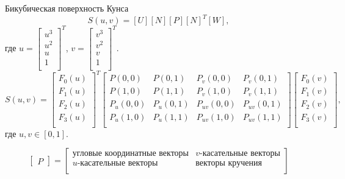 \documentclass{beamer}
\begin{document}
	\begin{frame}{Бикубическая поверхность Кунса}
		\[
			S(u,v) = [U][N][P][N]^T[W]
			,
		\]
		где
		$ u =
		\begin{bmatrix}
			u^3 \\
			u^2 \\
			u \\
			1 \\
		\end{bmatrix}^T$,
		$ v =
		\begin{bmatrix}
			v^3 \\
			v^2 \\
			v \\
			1 \\
		\end{bmatrix}^T
		$.
		\[
			S(u,v) = 
			\begin{bmatrix}
				F_0(u) \\
				F_1(u) \\
				F_2(u) \\
				F_3(u) \\
			\end{bmatrix}^T
			\begin{bmatrix}
				P(0,0) & P(0,1) & P_v(0,0) & P_v(0,1) \\
				P(1,0) & P(1,1) & P_v(1,0) & P_v(1,1) \\
				P_u(0,0) & P_u(0,1) & P_{uv}(0,0) & P_{uv}(0,1) \\
				P_u(1,0) & P_u(1,1) & P_{uv}(1,0) & P_{uv}(1,1) \\
			\end{bmatrix}
			\begin{bmatrix}
				F_0(v) \\
				F_1(v) \\
				F_2(v) \\
				F_3(v) \\
			\end{bmatrix}
			,
		\]
		где $u,v \in [0,1]$.

		\[
			\begin{bmatrix}
				P
			\end{bmatrix}
			=
			\begin{bmatrix}
				\text{угловые координатные векторы} & v\text{-касательные векторы} \\
				u\text{-касательные векторы} & \text{векторы кручения} \\
			\end{bmatrix}
			\]


\end{frame}
\end{document}
